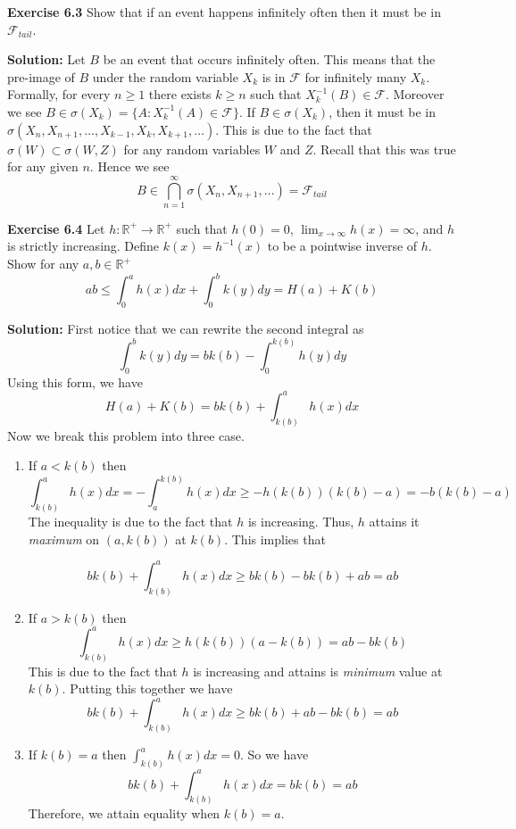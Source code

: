 \documentclass[12pt]{article}  %
\newcommand{\R}{{\mathbb{R}}}
\begin{document}
\newpage


\textbf{Exercise 6.3} Show that if an event happens infinitely often then it must be in $\mathcal{F}_{tail}$. 

\textbf{Solution:} Let $B$ be an event that occurs infinitely often. This means that the pre-image of $B$ under the random variable $X_k$ is in $\mathcal{F}$ for infinitely many $X_k$. Formally, for every $n\geq 1$ there exists $k\geq n$ such that $X_k^{-1}(B)\in\mathcal{F}$. Moreover we see $B\in \sigma(X_k) = \{A:X_k^{-1}(A)\in\mathcal{F}\}$. If $B\in\sigma(X_k)$, then it must be in $\sigma(X_n, X_{n+1}, \ldots, X_{k-1}, X_{k}, X_{k+1}, \ldots)$. This is due to the fact that $\sigma(W)\subset \sigma(W,Z)$ for any random variables $W$ and $Z$. Recall that this was true for any given $n$. Hence we see $$B\in\bigcap_{n=1}^{\infty}\sigma(X_n, X_{n+1}, \dots) = \mathcal{F}_{tail}$$

\newpage

\textbf{Exercise 6.4} Let $h:\R^{+}\to\R^{+}$ such that $h(0) = 0$, $\lim_{x\to\infty}h(x) = \infty$, and $h$ is strictly increasing. Define $k(x) = h^{-1}(x)$ to be a pointwise inverse of $h$. Show for any $a,b\in\R^{+}$ $$ab\leq \int_{0}^{a}h(x)dx + \int_{0}^{b}k(y)dy = H(a) + K(b)$$

\textbf{Solution:} First notice that we can rewrite the second integral as $$\int_{0}^{b}k(y)dy = bk(b) - \int_{0}^{k(b)}h(y)dy$$ Using this form, we have $$H(a) + K(b) = bk(b) + \int_{k(b)}^{a}h(x)dx$$ Now we break this problem into three case. 

\begin{enumerate}
\item If $a<k(b)$ then $$\int_{k(b)}^{a}h(x)dx = -\int_{a}^{k(b)}h(x)dx\geq -h(k(b))(k(b) - a) = -b(k(b) - a)$$
The inequality is due to the fact that $h$ is increasing. Thus, $h$ attains it \textit{maximum} on $(a,k(b))$ at $k(b)$. This implies that 

$$bk(b) + \int_{k(b)}^{a}h(x)dx\geq bk(b) - bk(b) + ab = ab$$

\item If $a>k(b)$ then $$\int_{k(b)}^{a}h(x)dx\geq h(k(b))(a - k(b)) = ab - bk(b)$$ This is due to the fact that $h$ is increasing and attains is \textit{minimum} value at $k(b)$. Putting this together we have $$bk(b) + \int_{k(b)}^{a}h(x)dx\geq bk(b) + ab - bk(b)= ab$$
\item If $k(b) = a$ then $\int_{k(b)}^{a}h(x)dx = 0$. So we have $$bk(b) + \int_{k(b)}^{a}h(x)dx = bk(b) = ab$$ Therefore, we attain equality when $k(b) = a$. 
\end{enumerate}
\end{document}
